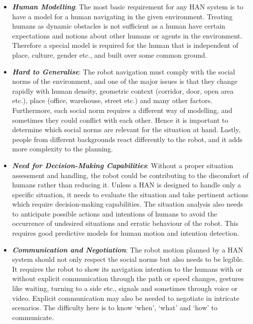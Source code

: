 \begin{itemize}[leftmargin=*]
    \item \textbf{\textit{Human Modelling}}: The most basic requirement for any HAN system is to have a model for a human navigating in the given environment. Treating humans as dynamic obstacles is not sufficient as a human have certain expectations and notions about other humans or agents in the environment. Therefore a special model is required for the human that is independent of place, culture, gender etc., and built over some common ground. 
    \item\textbf{\textit{Hard to Generalise}}: The robot navigation must comply with the social norms of the environment, and one of the major issues is that they change rapidly with human density, geometric context (corridor, door, open area etc.), place (office, warehouse, street etc.) and many other factors. Furthermore, each social norm requires a different way of modelling, and sometimes they could conflict with each other. Hence it is important to determine which social norms are relevant for the situation at hand. Lastly, people from different backgrounds react differently to the robot, and it adds more complexity to the planning.
    \item \textbf{\textit{Need for Decision-Making Capabilities}}: Without a proper situation assessment and handling, the robot could be contributing to the discomfort of humans rather than reducing it. Unless a HAN is designed to handle only a specific situation, it needs to evaluate the situation and take pertinent actions which require decision-making capabilities. The situation analysis also needs to anticipate possible actions and intentions of humans to avoid the occurrence of undesired situations and erratic behaviour of the robot. This requires good predictive models for human motion and intention detection.
    \item \textbf{\textit{Communication and Negotiation}}: The robot motion planned by a HAN system should not only respect the social norms but also needs to be legible. It requires the robot to show its navigation intention to the humans with or without explicit communication through the path or speed changes, gestures like waiting, turning to a side etc., signals and sometimes through voice or video. Explicit communication may also be needed to negotiate in intricate scenarios. The difficulty here is to know `when', `what' and `how' to communicate.

\end{itemize}

